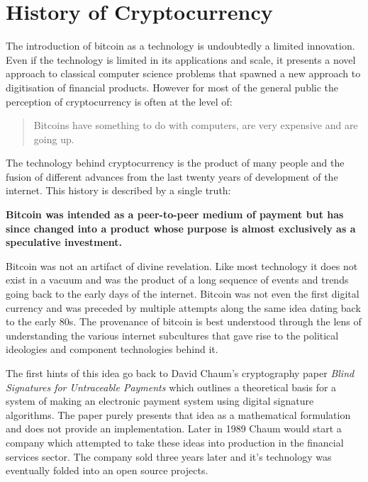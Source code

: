\chapter{History of Cryptocurrency}


The introduction of bitcoin as a technology is undoubtedly a limited innovation.
Even if the technology is limited in its applications and scale, it presents a
novel approach to classical computer science problems that spawned a new
approach to digitisation of financial products. However for most of the general
public the perception of cryptocurrency is often at the level of:

\begin{quote}
Bitcoins have something to do with computers, are very expensive and
are going up.
\end{quote}

The technology behind cryptocurrency is the product of many people and the
fusion of different advances from the last twenty years of development of
the internet. This history is described by a single truth:

\begin{infobox}
 \textbf{Bitcoin was intended as a peer-to-peer medium of payment but has since
  changed into a product whose purpose is almost exclusively as a speculative
  investment.}
\end{infobox}

Bitcoin was not an artifact of divine revelation. Like most
technology it does not exist in a vacuum and was the product of a long
sequence of events and trends going back to the early days of the
internet. Bitcoin was not even the first digital currency and was
preceded by multiple attempts along the same idea dating back to the
early 80s. The provenance of bitcoin is best understood through the lens
of understanding the various internet subcultures that gave rise to the
political ideologies and component technologies behind it.

The first hints of this idea go back to David Chaum's cryptography paper
\textit{Blind Signatures for Untraceable Payments} which outlines a theoretical
basis for a system of making an electronic payment system using digital
signature algorithms. \cite{chaum1984blind} The paper purely presents that idea
as a mathematical formulation and does not provide an implementation.  Later in
1989 Chaum would start a company which attempted to take these ideas into
production in the financial services sector. The company sold three years later
and it's technology was eventually folded into an open source projects.

